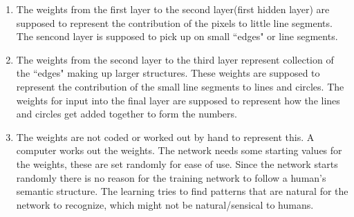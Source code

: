 \begin{enumerate}
  \item The weights from the first layer to the second layer(first hidden layer) are supposed to represent the contribution of the pixels to little line segments.
        The sencond layer is supposed to pick up on small ``edges" or line segments.
  \item The weights from the second layer to the third layer represent collection of the ``edges" making up larger structures.
        These weights are supposed to represent the contribution of the small line segments to lines and circles.
        The weights for input into the final layer are supposed to represent how the lines and circles get added together to form the numbers.
  \item The weights are not coded or worked out by hand to represent this.
        A computer works out the weights.
        The network needs some starting values for the weights, these are set randomly for ease of use.
        Since the network starts randomly there is no reason for the training network to follow a human's semantic structure.
        The learning tries to find patterns that are natural for the network to recognize, which might not be natural/sensical to humans.
\end{enumerate}
